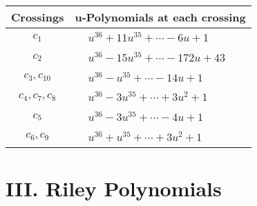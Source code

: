 \documentclass[1p]{elsarticle_modified}
\theoremstyle{definition}
\begin{document}
\begin{tabular}{m{50pt}|m{274pt}}
Crossings & \hspace{64pt}u-Polynomials at each crossing \\
\hline $$\begin{aligned}c_{1}\end{aligned}$$&$\begin{aligned}
&u^{36}+11 u^{35}+\cdots-6 u+1
\end{aligned}$\\
\hline $$\begin{aligned}c_{2}\end{aligned}$$&$\begin{aligned}
&u^{36}-15 u^{35}+\cdots-172 u+43
\end{aligned}$\\
\hline $$\begin{aligned}c_{3},c_{10}\end{aligned}$$&$\begin{aligned}
&u^{36}- u^{35}+\cdots-14 u+1
\end{aligned}$\\
\hline $$\begin{aligned}c_{4},c_{7},c_{8}\end{aligned}$$&$\begin{aligned}
&u^{36}-3 u^{35}+\cdots+3 u^2+1
\end{aligned}$\\
\hline $$\begin{aligned}c_{5}\end{aligned}$$&$\begin{aligned}
&u^{36}-3 u^{35}+\cdots-4 u+1
\end{aligned}$\\
\hline $$\begin{aligned}c_{6},c_{9}\end{aligned}$$&$\begin{aligned}
&u^{36}+u^{35}+\cdots+3 u^2+1
\end{aligned}$\\
\hline
\end{tabular}\newpage\renewcommand{\arraystretch}{1}
\centering \section*{ III. Riley Polynomials}
\end{document}
